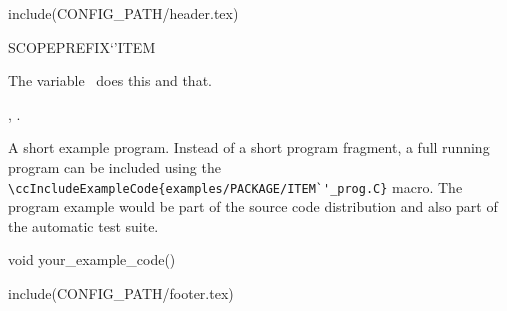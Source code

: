 include(CONFIG_PATH/header.tex)
\begin{ccRefVariable}SCOPE{PREFIX`'ITEM}  %


\ccDefinition
  
The variable \ccRefName\ does this and that.



\ccIsModel


\ccSeeAlso

,
.

\ccExample

A short example program.
Instead of a short program fragment, a full running program can be
included using the 
\verb|\ccIncludeExampleCode{examples/PACKAGE/ITEM`'_prog.C}| 
macro. The program example would be part of the source code distribution and
also part of the automatic test suite.

\begin{ccExampleCode}
void your_example_code() {
}
\end{ccExampleCode}


\end{ccRefVariable}

include(CONFIG_PATH/footer.tex)
